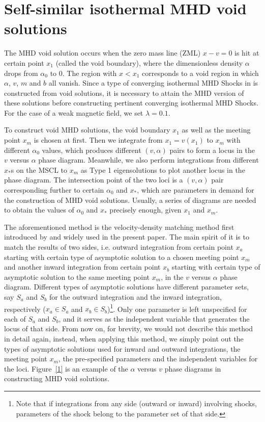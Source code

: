 \documentclass[fleqn,usenatbib]{mnras}
\begin{document}

\section{Self-similar isothermal MHD void solutions}
\label{s4}
The MHD void solution occurs when the zero mass line (ZML) $x-v=0$ is hit at certain point $x_{1}$ (called the void boundary), where the dimensionless density $\alpha$ drops from $\alpha_{0}$ to 0. The region with $x<x_{1}$ corresponds to a void region in which $\alpha$, $v$, $m$ and $b$ all vanish. Since a type of converging isothermal MHD Shocks in \citet{lou2014self} is constructed from void solutions, it is necessary to attain the MHD version of these solutions before constructing pertinent converging isothermal MHD Shocks. For the case of a weak magnetic field, we set $\lambda=0.1$.

To construct void MHD solutions, the void boundary $x_{1}$ as well as the meeting point $x_{m}$ is chosen at first. Then we integrate from $x_{1}=v(x_{1})$ to $x_{m}$ with different $\alpha_{0}$ values, which produces different $(v,\alpha)$ pairs to form a locus in the $v$ versus $\alpha$ phase diagram. Meanwhile, we also perform integrations from different $x_{*}$s on the MSCL to $x_{m}$ as Type 1 eigensolutions to plot another locus in the phase diagram. The intersection point of the two loci is a $(v,\alpha)$ pair corresponding further to certain $\alpha_{0}$ and $x_{*}$, which are parameters in demand for the construction of MHD void solutions. Usually, a series of diagrams are needed to obtain the values of $\alpha_{0}$ and $x_{*}$ precisely enough, given $x_{1}$ and $x_{m}$. 

The aforementioned method is the velocity-density matching method first introduced by \citet{hunter1977collapse} and widely used in the present paper. The main spirit of it is to match the results of two sides, i.e. outward integration from certain point $x_{a}$ starting with certain type of asymptotic solution to a chosen meeting point $x_{m}$ and another inward integration from certain point $x_{b}$ starting with certain type of asymptotic solution to the same meeting point $x_{m}$, in the $v$ versus $\alpha$ phase diagram. Different types of asymptotic solutions have different parameter sets, say $S_{a}$ and $S_{b}$ for the outward integration and the inward integration, respectively ($x_{a}\in S_{a}$ and $x_{b}\in S_{b}$)\footnote{Note that if integrations from any side (outward or inward) involving shocks, parameters of the shock belong to the parameter set of that side.}. Only one parameter is left unspecified for each of $S_{a}$ and $S_{b}$, and it serves as the independent variable that generates the locus of that side. 
From now on, for brevity, we would not describe this method in detail again, instead, when applying this method, we simply point out the types of asymptotic solutions used for inward and outward integrations, the meeting point $x_{m}$, the pre-specified parameters and the independent variables for the loci. Figure~\ref{1} is an example of the $\alpha$ versus $v$ phase diagrams in constructing MHD void solutions.
\end{document}
